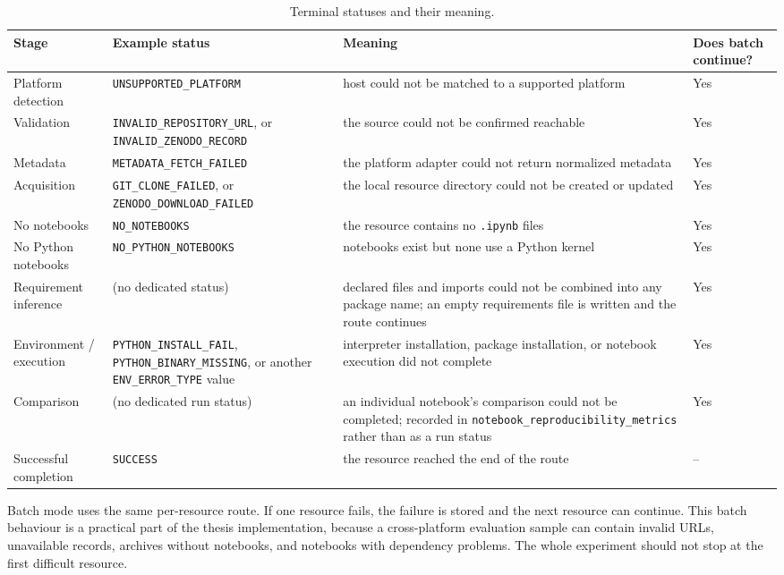 \begin{table}[ht]
\centering
\caption{Terminal statuses and their meaning.}
\label{tab:terminal-statuses}
\footnotesize
\begin{tabularx}{\textwidth}{@{}p{2.4cm}p{3.4cm}XX@{}}
\toprule
Stage & Example status & Meaning & Does batch continue?\tabularnewline
\midrule
Platform detection & \texttt{UNSUPPORTED\_}\linebreak\texttt{PLATFORM} & host could not be matched to a supported platform & Yes\tabularnewline
Validation & \texttt{INVALID\_REPOSITORY\_URL}, or \texttt{INVALID\_ZENODO\_RECORD} & the source could not be confirmed reachable & Yes\tabularnewline
Metadata & \texttt{METADATA\_}\linebreak\texttt{FETCH\_FAILED} & the platform adapter could not return normalized metadata & Yes\tabularnewline
Acquisition & \texttt{GIT\_CLONE\_FAILED}, or \texttt{ZENODO\_DOWNLOAD\_FAILED} & the local resource directory could not be created or updated & Yes\tabularnewline
No notebooks & \texttt{NO\_NOTEBOOKS} & the resource contains no \texttt{.ipynb} files & Yes\tabularnewline
No Python notebooks & \texttt{NO\_PYTHON\_}\linebreak\texttt{NOTEBOOKS} & notebooks exist but none use a Python kernel & Yes\tabularnewline
Requirement inference & (no dedicated status) & declared files and imports could not be combined into any package name; an empty requirements file is written and the route continues & Yes\tabularnewline
Environment / execution & \texttt{PYTHON\_INSTALL\_}\linebreak\texttt{FAIL}, \texttt{PYTHON\_}\linebreak\texttt{BINARY\_MISSING}, or another \texttt{ENV\_ERROR\_TYPE} value & interpreter installation, package installation, or notebook execution did not complete & Yes\tabularnewline
Comparison & (no dedicated run status) & an individual notebook's comparison could not be completed; recorded in \texttt{notebook\_}\linebreak\texttt{reproducibility\_metrics} rather than as a run status & Yes\tabularnewline
Successful completion & \texttt{SUCCESS} & the resource reached the end of the route & --\tabularnewline
\bottomrule
\end{tabularx}
\end{table}

Batch mode uses the same per-resource route. If one resource fails, the failure is stored and the next resource can continue. This batch behaviour is a practical part of the thesis implementation, because a cross-platform evaluation sample can contain invalid URLs, unavailable records, archives without notebooks, and notebooks with dependency problems. The whole experiment should not stop at the first difficult resource.

